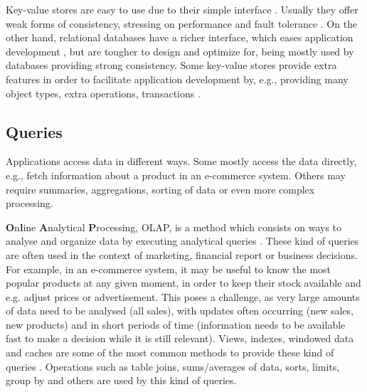 Key-value stores are easy to use due to their simple interface \cite{dynamo}. 
Usually they offer weak forms of consistency, stressing on performance and fault tolerance \cite{dynamo, cops, cure}.
On the other hand, relational databases have a richer interface, which eases application development \cite{spanner, noria, eiger}, but are tougher to design and optimize for, being mostly used by databases providing strong consistency.
Some key-value stores provide extra features in order to facilitate application development by, e.g., providing many object types, extra operations, transactions \cite{cure, walter}.

\subsection{Queries}
\label{subsec:queries}


Applications access data in different ways.
Some mostly access the data directly, e.g., fetch information about a product in an e-commerce system.
Others may require summaries, aggregations, sorting of data or even more complex processing.

\textbf{O}n\textbf{l}ine \textbf{A}nalytical \textbf{P}rocessing, OLAP, is a method which consists on ways to analyse and organize data by executing analytical queries \cite{dbtoaster, viewSelection, optIncMaintenance, effMaintenance}.
These kind of queries are often used in the context of marketing, financial report or business decisions.
For example, in an e-commerce system, it may be useful to know the most popular products at any given moment, in order to keep their stock available and e.g. adjust prices or advertisement.
This poses a challenge, as very large amounts of data need to be analysed (all sales), with updates often occurring (new sales, new products) and in short periods of time (information needs to be available fast to make a decision while it is still relevant).
Views, indexes, windowed data and caches are some of the most common methods to provide these kind of queries \cite{noria, dbtoaster, pequod, txcache, viewSelection, optIncMaintenance, effMaintenance}.
Operations such as table joins, sums/averages of data, sorts, limits, group by and others are used by this kind of queries. 

